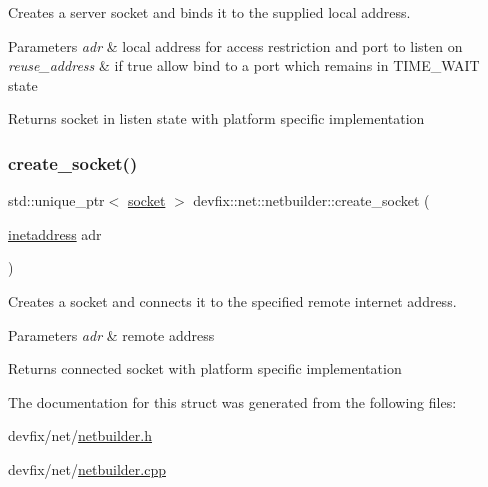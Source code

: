 Creates a server socket and binds it to the supplied local address. 


\begin{DoxyParams}{Parameters}
{\em adr} & local address for access restriction and port to listen on \\
\hline
{\em reuse\+\_\+address} & if true allow bind to a port which remains in T\+I\+M\+E\+\_\+\+W\+A\+IT state \\
\hline
\end{DoxyParams}
\begin{DoxyReturn}{Returns}
socket in listen state with platform specific implementation 
\end{DoxyReturn}
\mbox{\label{structdevfix_1_1net_1_1netbuilder_a9d9eb6cb050ca920aa647baaf4692405}} 
\subsubsection{\texorpdfstring{create\+\_\+socket()}{create\_socket()}}
{\footnotesize\ttfamily std\+::unique\+\_\+ptr$<$ \hyperlink{structdevfix_1_1net_1_1socket}{socket} $>$ devfix\+::net\+::netbuilder\+::create\+\_\+socket (\begin{DoxyParamCaption}\item[{\hyperlink{structdevfix_1_1net_1_1inetaddress}{inetaddress}}]{adr }\end{DoxyParamCaption})\hspace{0.3cm}{\ttfamily [static]}}



Creates a socket and connects it to the specified remote internet address. 


\begin{DoxyParams}{Parameters}
{\em adr} & remote address \\
\hline
\end{DoxyParams}
\begin{DoxyReturn}{Returns}
connected socket with platform specific implementation 
\end{DoxyReturn}


The documentation for this struct was generated from the following files\+:\begin{DoxyCompactItemize}
\item 
devfix/net/\hyperlink{netbuilder_8h}{netbuilder.\+h}\item 
devfix/net/\hyperlink{netbuilder_8cpp}{netbuilder.\+cpp}\end{DoxyCompactItemize}
